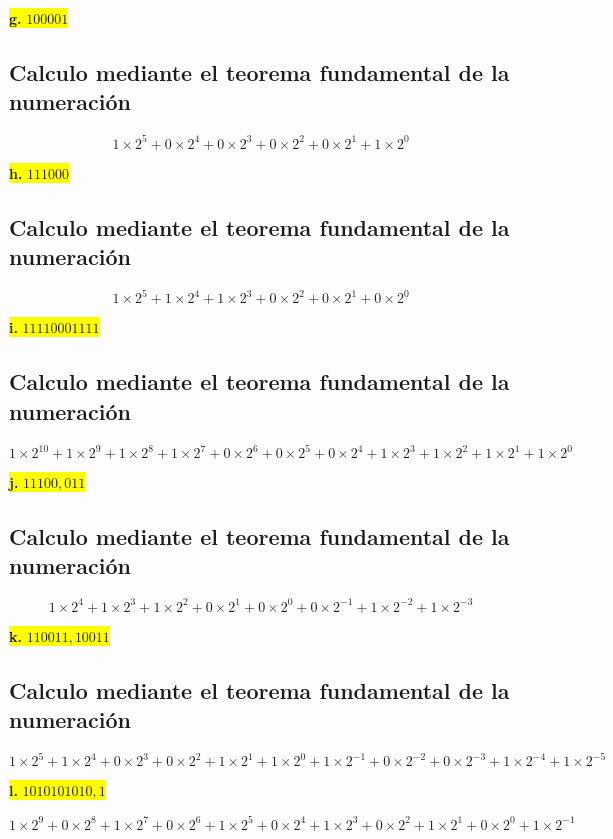 \documentclass[a4paper,12pt]{article}
\begin{document}
	\begin{center}
		\colorbox{yellow}{{\textbf{g.} $100001$}}
		\subsection*{Calculo mediante el teorema fundamental de la numeración}
		\[
		1\times2^{5} + 0\times2^{4} + 0\times2^{3} + 0\times2^{2} + 0\times2^{1} + 1\times2^{0}
		\]
	\end{center}
	\begin{center}
		\colorbox{yellow}{{\textbf{h.} $111000$}}
		\subsection*{Calculo mediante el teorema fundamental de la numeración}
		\[
		1\times2^{5} + 1\times2^{4} + 1\times2^{3} + 0\times2^{2} + 0\times2^{1} + 0\times2^{0}
		\]
	\end{center}
	\newpage
	\begin{center}
		\colorbox{yellow}{{\textbf{i.} $11110001111$}}
		\subsection*{Calculo mediante el teorema fundamental de la numeración}
		\[
		1\times2^{10} + 1\times2^{9} + 1\times2^{8} + 1\times2^{7} + 0\times2^{6} + 0\times2^{5} + 0\times2^{4} + 1\times2^{3} + 1\times2^{2} + 1\times2^{1} + 1\times2^{0}
		\]
	\end{center}
	\begin{center}
		\colorbox{yellow}{{\textbf{j.} $11100,011$}}
		\subsection*{Calculo mediante el teorema fundamental de la numeración}
		\[
		1\times2^{4} + 1\times2^{3} + 1\times2^{2} + 0\times2^{1} + 0\times2^{0} + 0\times2^{-1} + 1\times2^{-2} + 1\times2^{-3} 
		\]
	\end{center}
	\begin{center}
		\colorbox{yellow}{{\textbf{k.} $110011,10011$}}
		\subsection*{Calculo mediante el teorema fundamental de la numeración}
		\[
		1\times2^{5} + 1\times2^{4} + 0\times2^{3} + 0\times2^{2} + 1\times2^{1} + 1\times2^{0} + 1\times2^{-1} + 0\times2^{-2} + 0\times2^{-3} + 1\times2^{-4} + 1\times2^{-5}
		\]
	\end{center}
	\begin{center}
		\colorbox{yellow}{{\textbf{l.} $1010101010,1$}}
	
		\[
		1\times2^{9} + 0\times2^{8} + 1\times2^{7} + 0\times2^{6} + 1\times2^{5} + 0\times2^{4} + 1\times2^{3} + 0\times2^{2} + 1\times2^{1} + 0\times2^{0} + 1\times2^{-1}
		\]
	\end{center}
\end{document}
